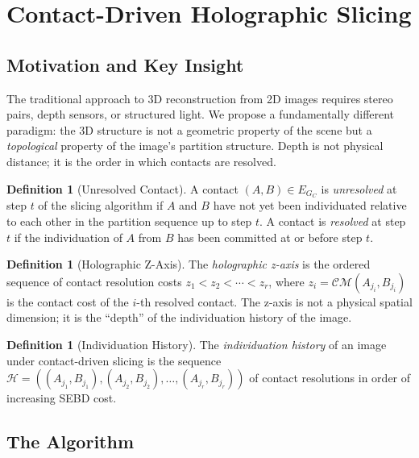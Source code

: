 \documentclass[twocolumn]{article}
\theoremstyle{plain}
\theoremstyle{definition}
\newtheorem{definition}[theorem]{Definition}
\newcommand{\CM}{\mathcal{CM}}
\begin{document}
\section{Contact-Driven Holographic Slicing}
\label{sec:slicing}

\subsection{Motivation and Key Insight}

The traditional approach to 3D reconstruction from 2D images requires stereo
pairs, depth sensors, or structured light. We propose a fundamentally different
paradigm: the 3D structure is not a geometric property of the scene but a
\emph{topological} property of the image's partition structure. Depth is not
physical distance; it is the order in which contacts are resolved.

\begin{definition}[Unresolved Contact]
\label{def:unresolved}
A contact $(A,B) \in E_{G_C}$ is \emph{unresolved} at step $t$ of the slicing
algorithm if $A$ and $B$ have not yet been individuated relative to each other
in the partition sequence up to step $t$. A contact is \emph{resolved} at step $t$
if the individuation of $A$ from $B$ has been committed at or before step $t$.
\end{definition}

\begin{definition}[Holographic Z-Axis]
\label{def:zaxis}
The \emph{holographic z-axis} is the ordered sequence of contact resolution
costs $z_1 < z_2 < \cdots < z_r$, where $z_i = \CM(A_{j_i}, B_{j_i})$ is
the contact cost of the $i$-th resolved contact. The z-axis is not a physical
spatial dimension; it is the ``depth'' of the individuation history of the image.
\end{definition}

\begin{definition}[Individuation History]
\label{def:indivhistory}
The \emph{individuation history} of an image under contact-driven slicing is the
sequence $\mathcal{H} = ((A_{j_1}, B_{j_1}), (A_{j_2}, B_{j_2}), \ldots, (A_{j_r}, B_{j_r}))$
of contact resolutions in order of increasing SEBD cost.
\end{definition}

\subsection{The Algorithm}
\end{document}
